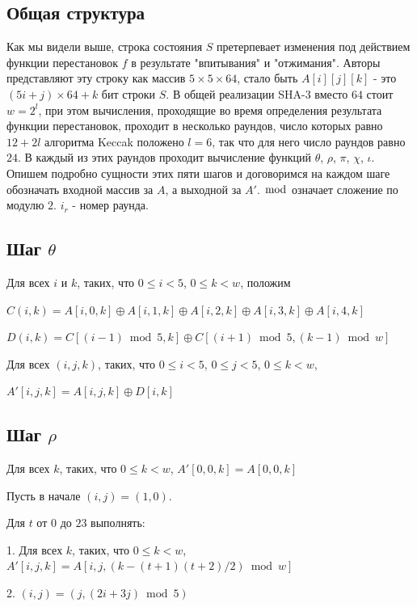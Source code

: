 \documentclass[a4paper,12pt]{article}
\theoremstyle{plain} %
\theoremstyle{definition} %
\theoremstyle{remark} %
\begin{document}
	\subsection{Общая структура}
	
	Как мы видели выше, строка состояния $S$ претерпевает изменения под действием функции перестановок $f$ в результате "впитывания" и "отжимания". Авторы представляют эту строку как массив $5 \times 5 \times 64$, стало быть $A[i][j][k]$ - это  $(5i+j)\times 64 + k$ бит строки $S$. В общей реализации SHA-3 вместо $64$ стоит $w = 2^l$, при этом вычисления, проходящие во время определения результата функции перестановок, проходит в несколько раундов, число которых равно $12+2l$ алгоритма Keccak положено $l = 6$, так что для него число раундов равно $24$. В каждый из этих раундов проходит вычисление функций $\theta$, $\rho$, $\pi$, $\chi$, $\iota$. Опишем подробно сущности этих пяти шагов и договоримся на каждом шаге обозначать входной массив за $A$, а выходной за $A'$. $\bmod$ означает сложение по модулю $2$. $i_r$ - номер раунда.
	
	\subsection{Шаг $\theta$}
	
	Для всех $i$ и $k$, таких, что $0 \leqslant i < 5$, $0 \leqslant k < w$, положим
	
	$C(i, k) = A[i, 0, k] \oplus A[i, 1, k] \oplus A[i, 2, k] \oplus A[i, 3, k] \oplus A[i, 4, k]$ 
	
	$D(i, k) = C[(i-1) \bmod 5, k] \oplus C[(i+1) \bmod 5, (k-1) \bmod w]$
	
	Для всех $(i, j, k)$, таких, что $0 \leqslant i < 5$, $0 \leqslant j < 5$, $0 \leqslant k < w$, 
	
	$A'[i, j,k] = A[i, j, k] \oplus D[i, k]$ 
	
	\subsection{Шаг $\rho$}
	
	Для всех $k$, таких, что $0 \leqslant k < w$, $A'[0,0,k] = A[0,0,k]$
	
	Пусть в начале $(i, j) = (1, 0)$. 
	
	Для $t$ от $0$ до $23$ выполнять:
	
	1. Для всех $k$, таких, что 
	$0 \leqslant k < w$, $A'[i,j, k] = A[i, j, (k-(t+1)(t+2)/2) \bmod w]$
	
	2. $(i, j) = (j, (2i + 3j) \bmod 5)$
	
\end{document}

